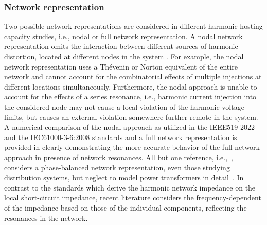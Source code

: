 \subsubsection{Network representation} 
\label{sec:network_representation} 

Two possible network representations are considered in different harmonic hosting capacity studies, i.e., nodal or full network representation. A nodal network representation omits the interaction between different sources of harmonic distortion, located at different nodes in the system \cite{van_acker_impact_2025}. For example, the nodal network representation uses a Thévenin or Norton equivalent of the entire network and cannot account for the combinatorial effects of multiple injections at different locations simultaneously. Furthermore, the nodal approach is unable to account for the effects of a series resonance, i.e., harmonic current injection into the considered node may not cause a local violation of the harmonic voltage limits, but causes an external violation somewhere further remote in the system. A numerical comparison of the nodal approach as utilized in the IEEE519-2022 and the IEC61000-3-6:2008 standards and a full network representation is provided in \cite{van_acker_impact_2025} clearly demonstrating the more accurate behavior of the full network approach in presence of network resonances.  All but one reference, i.e.,~\cite{carmelito_hosting_2023}, considers a phase-balanced network representation, even those studying distribution systems, but neglect to model power transformers in detail~\cite{geth_harmonic_2022}. In contrast to the standards which derive the harmonic network impedance on the local short-circuit impedance, recent literature considers the frequency-dependent of the impedance based on those of the individual components, reflecting the resonances in the network.



